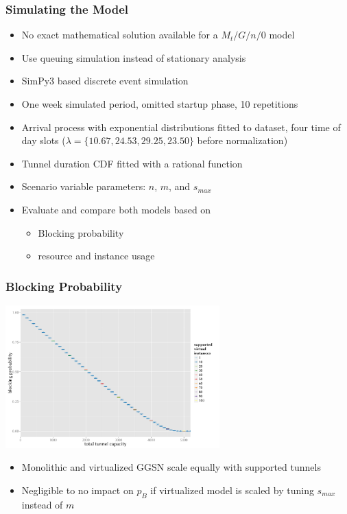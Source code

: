 \documentclass{beamer}
\begin{document}
\begin{frame}
	\frametitle{Simulating the Model}

	\begin{itemize}
		\item No exact mathematical solution available for a $M_t/G/n/0$ model
		\item Use queuing simulation instead of stationary analysis
		\item SimPy3 based discrete event simulation
		\item One week simulated period, omitted startup phase, 10 repetitions
		\item Arrival process with exponential distributions fitted to dataset, four time of day slots ($\lambda=\{10.67,24.53,29.25,23.50\}$ before normalization)
		\item Tunnel duration CDF fitted with a rational function
		\item Scenario variable parameters: $n$, $m$, and $s_{max}$
		\item Evaluate and compare both models based on
		\begin{itemize}
			\item Blocking probability
			\item resource and instance usage
		\end{itemize}
	\end{itemize}

\end{frame}

\begin{frame}
	\frametitle{Blocking Probability}

	\begin{center}
		\includegraphics[height=5.5cm]{../../chapters/04-mobilenets/images/R-virtualized-blocking.pdf}
	\end{center}

	\begin{itemize}
		\item Monolithic and virtualized GGSN scale equally with supported tunnels
		\item Negligible to no impact on $p_B$ if virtualized model is scaled by tuning $s_{max}$ instead of $m$
	\end{itemize}
\end{frame}
\end{document}
